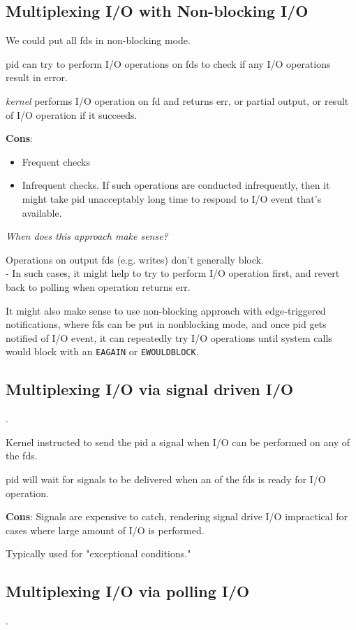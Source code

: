 \documentclass[10pt]{amsart}
\begin{document}
\subsection{Multiplexing I/O with Non-blocking I/O}

We could put all fds in non-blocking mode.

pid can try to perform I/O operations on fds to check if any I/O operations result in error.

\emph{kernel} performs I/O operation on fd and returns err, or partial output, or result of I/O operation if it succeeds.

\textbf{Cons}:
\begin{itemize}
	\item Frequent checks
	\item Infrequent checks. If such operations are conducted infrequently, then it might take pid unacceptably long time to respond to I/O event that's available.
\end{itemize}

\emph{When does this approach make sense?}

Operations on output fds (e.g. writes) don't generally block.  \\
- In such cases, it might help to try to perform I/O operation first, and revert back to polling when operation returns err.

It might also make sense to use non-blocking approach with edge-triggered notifications, where fds can be put in nonblocking mode, and once pid gets notified of I/O event, it can repeatedly try I/O operations until system calls would block with an \texttt{EAGAIN} or \texttt{EWOULDBLOCK}. 

\subsection{Multiplexing I/O via signal driven I/O}.

Kernel instructed to send the pid a signal when I/O can be performed on any of the fds.

pid will wait for signals to be delivered when an of the fds is ready for I/O operation.

\textbf{Cons}: Signals are expensive to catch, rendering signal drive I/O impractical for cases where large amount of I/O is performed.

Typically used for "exceptional conditions."

\subsection{Multiplexing I/O via polling I/O}.
\end{document}
